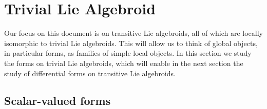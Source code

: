    

\section{Trivial Lie Algebroid}
\label{ChFormsSectionTrivial}

    


    

Our focus on this document is on transitive Lie algebroids, all of which are locally isomorphic to trivial Lie algebroids. This will allow us to think of global objects, in particular forms, as families of simple local objects. In this section we study the forms on trivial Lie algebroids, which will enable in the next section the study of differential forms on transitive Lie algebroids.

\subsection{Scalar-valued forms}

